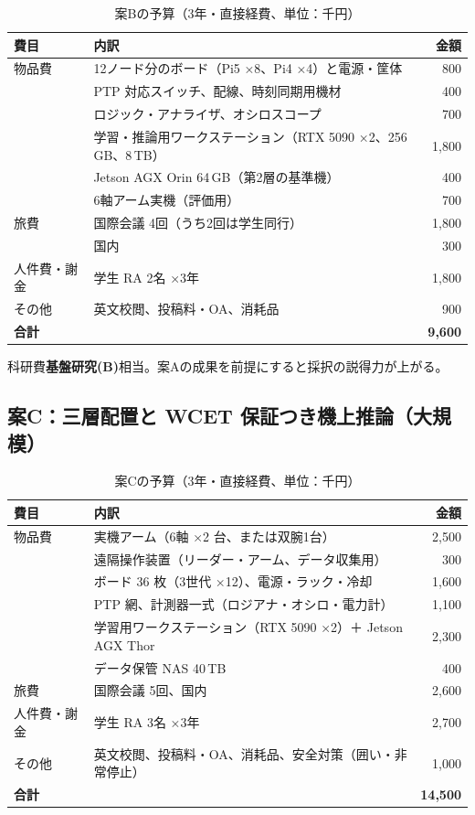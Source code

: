 \documentclass[11pt,a4paper]{article}
\newcommand{\keyp}[1]{\textbf{\textcolor{blue!45!black}{#1}}}
\begin{document}
\begin{table}[htbp]
\centering
\small
\caption{案Bの予算（3年・直接経費、単位：千円）}
\begin{tabularx}{\textwidth}{@{}l X r@{}}
\toprule
\textbf{費目} & \textbf{内訳} & \textbf{金額} \\
\midrule
物品費 & 12ノード分のボード（Pi5 ×8、Pi4 ×4）と電源・筐体 & 800 \\
       & PTP 対応スイッチ、配線、時刻同期用機材 & 400 \\
       & ロジック・アナライザ、オシロスコープ & 700 \\
       & 学習・推論用ワークステーション（RTX 5090 ×2、256\,GB、8\,TB） & 1,800 \\
       & Jetson AGX Orin 64\,GB（第2層の基準機） & 400 \\
       & 6軸アーム実機（評価用） & 700 \\
\midrule
旅費 & 国際会議 4回（うち2回は学生同行） & 1,800 \\
     & 国内 & 300 \\
\midrule
人件費・謝金 & 学生 RA 2名 ×3年 & 1,800 \\
\midrule
その他 & 英文校閲、投稿料・OA、消耗品 & 900 \\
\midrule
\textbf{合計} & & \textbf{9,600} \\
\bottomrule
\end{tabularx}
\end{table}

\noindent
科研費\keyp{基盤研究(B)}相当。案Aの成果を前提にすると採択の説得力が上がる。

\subsection{案C：三層配置と WCET 保証つき機上推論（大規模）}

\begin{table}[htbp]
\centering
\small
\caption{案Cの予算（3年・直接経費、単位：千円）}
\begin{tabularx}{\textwidth}{@{}l X r@{}}
\toprule
\textbf{費目} & \textbf{内訳} & \textbf{金額} \\
\midrule
物品費 & 実機アーム（6軸 ×2 台、または双腕1台） & 2,500 \\
       & 遠隔操作装置（リーダー・アーム、データ収集用） & 300 \\
       & ボード 36 枚（3世代 ×12）、電源・ラック・冷却 & 1,600 \\
       & PTP 網、計測器一式（ロジアナ・オシロ・電力計） & 1,100 \\
       & 学習用ワークステーション（RTX 5090 ×2）＋ Jetson AGX Thor & 2,300 \\
       & データ保管 NAS 40\,TB & 400 \\
\midrule
旅費 & 国際会議 5回、国内 & 2,600 \\
\midrule
人件費・謝金 & 学生 RA 3名 ×3年 & 2,700 \\
\midrule
その他 & 英文校閲、投稿料・OA、消耗品、安全対策（囲い・非常停止） & 1,000 \\
\midrule
\textbf{合計} & & \textbf{14,500} \\
\bottomrule
\end{tabularx}
\end{table}
\end{document}
